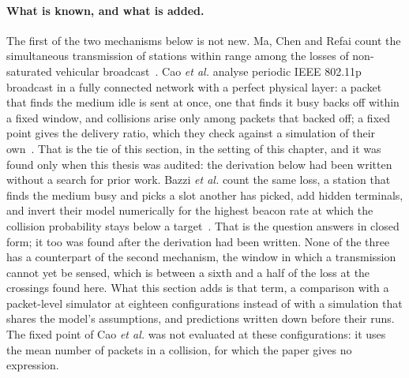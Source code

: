 \paragraph{What is known, and what is added.} The first of the two mechanisms below is not
new. Ma, Chen and Refai count the simultaneous transmission of stations within range among the
losses of non-saturated vehicular broadcast~\cite{ma2009dsrc}. Cao \emph{et al.} analyse
periodic IEEE 802.11p broadcast in a fully connected network
with a perfect physical layer: a packet that finds the medium idle is sent at once, one that
finds it busy backs off within a fixed window, and collisions arise only among packets that
backed off; a fixed point gives the delivery ratio, which they check against a simulation of
their own~\cite{cao2021dsrc}. That is the tie of this section, in the setting of this chapter,
and it was found only when this thesis was audited: the derivation below had been written
without a search for prior work. Bazzi \emph{et al.} count the same loss, a station that finds
the medium busy and picks a slot another has picked, add hidden terminals, and invert their
model numerically for the highest beacon rate at which the collision probability stays below a
target~\cite{bazzi2016beaconing}. That is the question  answers in closed form; it
too was found after the derivation had been written. None of the three has a counterpart of the
second mechanism,
the window in which a transmission cannot yet be sensed, which is between a sixth and a half
of the loss at the crossings found here. What this section adds is that term, a comparison
with a packet-level simulator at eighteen configurations instead of with a simulation that
shares the model's assumptions, and predictions written down before their runs. The fixed
point of Cao \emph{et al.} was not evaluated at these configurations: it uses the mean number
of packets in a collision, for which the paper gives no expression.

